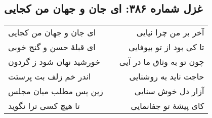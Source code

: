 \begin{center}
\section*{غزل شماره ۳۸۶: ای جان و جهان من کجایی}
\label{sec:386}
\begin{longtable}{l p{0.5cm} r}
ای جان و جهان من کجایی
&&
آخر بر من چرا نیایی
\\
ای قبلهٔ حسن و گنج خوبی
&&
تا کی بود از تو بیوفایی
\\
خورشید نهان شود ز گردون
&&
چون تو به وثاق ما در آیی
\\
اندر خم زلف بت پرستت
&&
حاجت ناید به روشنایی
\\
زین پس مطلب میان مجلس
&&
آزار دل خوش سنایی
\\
تا هیچ کسی ترا نگوید
&&
کای پیشهٔ تو جفانمایی
\\
\end{longtable}
\end{center}
